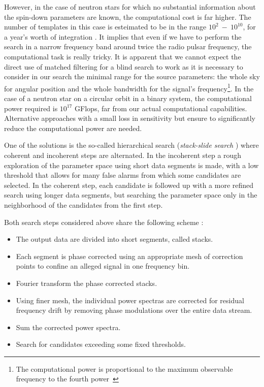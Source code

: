 However, in the case of neutron stars for which no substantial 
information about the spin-down parameters are known, the 
computational cost is far higher. 
The number of templates in this case is esteimated to be 
in the range  $10^2~ - ~  10^{10}$, for a year's worth of 
integration \cite{DhurandharCW}. It implies that even if 
we have to perform the search in a narrow frequency band 
around twice the radio pulsar frequency, the computational 
task is really tricky.  It is apparent that we cannot 
expect the direct use of matched filtering for 
a blind search to work as it is necessary to consider
in our search the minimal range for the source 
parameters: the whole sky for angular position and the  
whole bandwidth for the signal's frequency\footnote{The 
computational power is proportional to the maximum observable 
frequency to the fourth power~\cite{DhurandharCW}}.  
In the case of a neutron star on a circular orbit in a binary
system, the computational power required is $10^{17}$ GFlops, 
far from our actual computational capabilities.
Alternative approaches with a small loss in sensitivity
but ensure to significantly reduce the computational 
power are needed.

One of the solutions is the so-called hierarchical search 
({\em stack-slide search} \cite{BRADYbis}) where coherent 
and incoherent steps are alternated. In the incoherent step 
a rough exploration of the parameter space using short data 
segments is made, with a low threshold that allows for 
many false alarms from which some candidates are selected. In the 
coherent step, each candidate is followed up with a more refined 
search using longer data segments, but searching the parameter 
space only in the neighborhood of the candidates from the first step.

Both search steps considered above share the following 
scheme \cite{BRADY1}: 
\begin{itemize}
\item The output data are divided into short segments, called stacks.
\item Each segment is phase corrected using an appropriate mesh of 
correction points to confine an alleged signal in one frequency bin.
\item Fourier transform the phase corrected stacks.
\item Using finer mesh, the individual power spectras are corrected 
for residual frequency drift by removing phase modulations over 
the entire data stream.
\item Sum the corrected power spectra.
\item Search for candidates exceeding some fixed thresholds.
\end{itemize}

